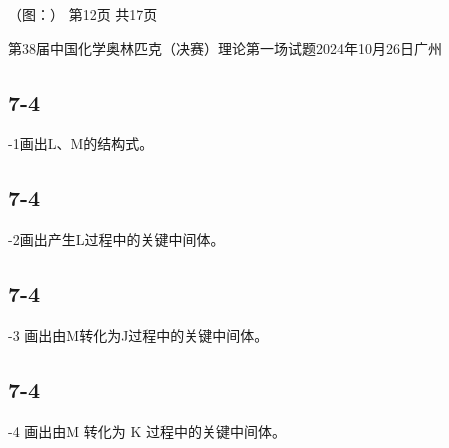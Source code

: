 （图：）
第12页 共17页

第38届中国化学奥林匹克（决赛）理论第一场试题2024年10月26日广州

\subsection*{7-4}
-1画出L、M的结构式。

\subsection*{7-4}
-2画出产生L过程中的关键中间体。

\subsection*{7-4}
-3 画出由M转化为J过程中的关键中间体。

\subsection*{7-4}
-4 画出由M 转化为 K 过程中的关键中间体。
